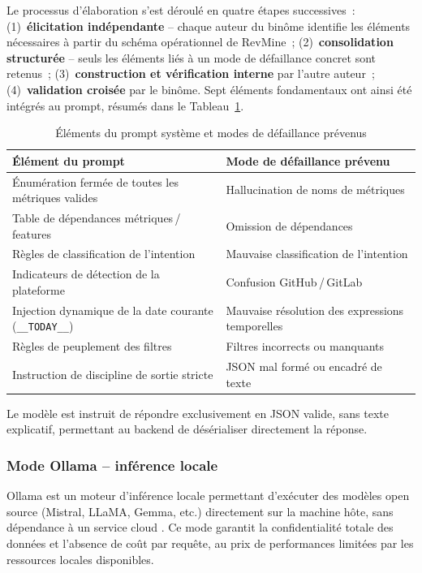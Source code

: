 Le processus d'élaboration s'est déroulé en quatre étapes successives~: (1)~\textbf{élicitation
indépendante} -- chaque auteur du binôme identifie les éléments nécessaires à partir du schéma
opérationnel de RevMine~; (2)~\textbf{consolidation structurée} -- seuls les éléments liés à un
mode de défaillance concret sont retenus~; (3)~\textbf{construction et vérification interne} par
l'autre auteur~; (4)~\textbf{validation croisée} par le binôme. Sept éléments fondamentaux ont
ainsi été intégrés au prompt, résumés dans le Tableau~\ref{tab:prompt_elements_fr}.

\begin{table}[H]
\centering
\small
\caption{Éléments du prompt système et modes de défaillance prévenus}
\label{tab:prompt_elements_fr}
\begin{tabular}{|>{\raggedright\arraybackslash}p{6.5cm}
                |>{\raggedright\arraybackslash}p{6.5cm}|}
\hline
\textbf{Élément du prompt} & \textbf{Mode de défaillance prévenu} \\
\hline
Énumération fermée de toutes les métriques valides & Hallucination de noms de métriques \\
\hline
Table de dépendances métriques\,/\,features & Omission de dépendances \\
\hline
Règles de classification de l'intention & Mauvaise classification de l'intention \\
\hline
Indicateurs de détection de la plateforme & Confusion GitHub\,/\,GitLab \\
\hline
Injection dynamique de la date courante (\texttt{\_\_TODAY\_\_}) & Mauvaise résolution des expressions temporelles \\
\hline
Règles de peuplement des filtres & Filtres incorrects ou manquants \\
\hline
Instruction de discipline de sortie stricte & JSON mal formé ou encadré de texte \\
\hline
\end{tabular}
\end{table}

Le modèle est instruit de répondre exclusivement en JSON valide, sans texte explicatif, permettant
au backend de désérialiser directement la réponse.

\subsubsection*{Mode Ollama -- inférence locale}

Ollama est un moteur d'inférence locale permettant d'exécuter des modèles open source (Mistral,
LLaMA, Gemma, etc.) directement sur la machine hôte, sans dépendance à un service cloud
\parencite{ollama2023}. Ce mode garantit la confidentialité totale des données et l'absence de
coût par requête, au prix de performances limitées par les ressources locales disponibles.

